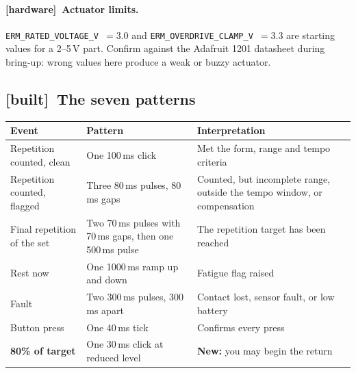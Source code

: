 \documentclass[11pt]{article}
\newcommand{\built}{{\sffamily\scriptsize\color{good}\textbf{[built]}}\ }
\newcommand{\todo}{{\sffamily\scriptsize\color{bad}\textbf{[hardware]}}\ }
\begin{document}
\paragraph{\todo Actuator limits.} \texttt{ERM\_RATED\_VOLTAGE\_V}~$=3.0$ and
\texttt{ERM\_OVERDRIVE\_CLAMP\_V}~$=3.3$ are starting values for a 2--5\,V
part. Confirm against the Adafruit 1201 datasheet during bring-up: wrong
values here produce a weak or buzzy actuator.

\subsection{\built The seven patterns}

\begin{table}[H]
\centering\small
\begin{tabularx}{\linewidth}{@{}p{34mm} p{46mm} X@{}}
\toprule
\textbf{Event} & \textbf{Pattern} & \textbf{Interpretation} \\
\midrule
Repetition counted, clean & One 100\,ms click & Met the form, range and tempo criteria \\[3pt]
Repetition counted, flagged & Three 80\,ms pulses, 80\,ms gaps & Counted, but incomplete range, outside the tempo window, or compensation \\[3pt]
Final repetition of the set & Two 70\,ms pulses with 70\,ms gaps, then one 500\,ms pulse & The repetition target has been reached \\[3pt]
Rest now & One 1000\,ms ramp up and down & Fatigue flag raised \\[3pt]
Fault & Two 300\,ms pulses, 300\,ms apart & Contact lost, sensor fault, or low battery \\[3pt]
Button press & One 40\,ms tick & Confirms every press \\[3pt]
\textbf{80\% of target} & One 30\,ms click at reduced level & \textbf{New:} you may begin the return \\
\bottomrule
\end{tabularx}
\end{table}
\end{document}
